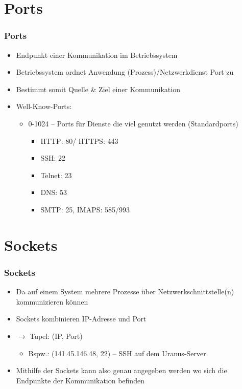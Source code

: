 \documentclass[xcolor=dvipsnames, aspectratio=169]{beamer}
\begin{document}
\section{Ports}
\begin{frame}
	\frametitle{Ports}
	\begin{itemize}
		\item Endpunkt einer Kommunikation im Betriebssystem
		\item Betriebssystem ordnet Anwendung (Prozess)/Netzwerkdienst Port zu 
		\item Bestimmt somit Quelle \& Ziel einer Kommunikation
		\item Well-Know-Ports:
		\begin{itemize}
			\item 0-1024 -- Ports für Dienste die viel genutzt werden (Standardports)
			\begin{itemize}
				\item HTTP: 80/ HTTPS: 443
				\item SSH: 22 
				\item Telnet: 23
				\item DNS: 53
				\item SMTP: 25, IMAPS: 585/993
			\end{itemize}
		\end{itemize}
	\end{itemize}
\end{frame}

\section{Sockets}
\begin{frame}
	\frametitle{Sockets}
	\begin{itemize} 
		\item Da auf einem System mehrere Prozesse über Netzwerkschnittstelle(n) kommunizieren können
		\item Sockets kombinieren IP-Adresse und Port
		\item $\rightarrow$ Tupel: (IP, Port) 
		\begin{itemize}
			\item Bspw.: (141.45.146.48, 22) -- SSH auf dem Uranus-Server 
		\end{itemize}
		\item Mithilfe der Sockets kann also genau angegeben werden wo sich die Endpunkte der Kommunikation befinden
	\end{itemize}
\end{frame}
\end{document}
